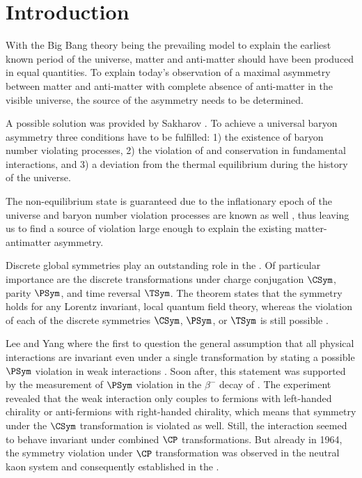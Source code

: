 
\chapter{Introduction}
\label{ch:introduction}

With the Big Bang theory being the prevailing model to explain the earliest
known period of the universe, matter and anti-matter should have been produced
in equal quantities. To explain today's observation of a maximal asymmetry
between matter and anti-matter with complete absence of anti-matter in the
visible universe, the source of the asymmetry needs to be determined.

A possible solution was provided by Sakharov \cite{Sakharov:1967dj}. To achieve
a universal baryon asymmetry three conditions have to be fulfilled: 1) the
existence of baryon number violating processes, 2) the violation of \CSym and
\CP conservation in fundamental interactions, and 3) a deviation from the
thermal equilibrium during the history of the universe.

The non-equilibrium state is guaranteed due to the inflationary epoch of the
universe and baryon number violation processes are known as well
\cite{tHooft:1976up,Rubakov:1996vz}, thus leaving us to find a source of \CP
violation large enough to explain the existing matter-antimatter asymmetry.

Discrete global symmetries play an outstanding role in the \SM. Of particular
importance are the discrete transformations under charge conjugation $\CSym$,
parity $\PSym$, and time reversal $\TSym$. The \CPT theorem states that the \CPT
symmetry holds for any Lorentz invariant, local quantum field theory, whereas
the violation of each of the discrete symmetries $\CSym$, $\PSym$, or $\TSym$ is
still possible \cite{set:cpt}.

Lee and Yang where the first to question the general assumption that all
physical interactions are invariant even under a single transformation by
stating a possible $\PSym$ violation in weak interactions \cite{Lee:1956qn}.
Soon after, this statement was supported by the measurement of $\PSym$ violation
in the $\beta^{-}$ decay of \cobaltsixty \cite{Wu:1957my}. The experiment
revealed that the weak interaction only couples to fermions with left-handed
chirality or anti-fermions with right-handed chirality, which means that
symmetry under the $\CSym$ transformation is violated as well. Still, the
interaction seemed to behave invariant under combined $\CP$ transformations.
But already in 1964, the symmetry violation under $\CP$ transformation was observed in
the neutral kaon system and consequently established in the \SM
\cite{Christenson:1964fg}.

